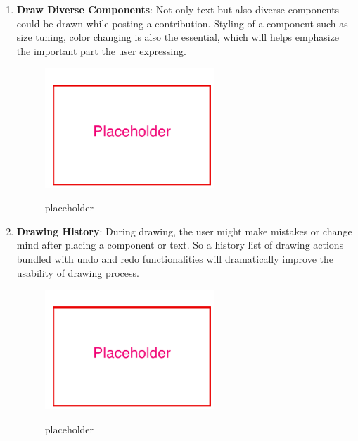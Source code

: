 \begin{enumerate}
\item
\textbf{Draw Diverse Components}: Not only text but also diverse components could be drawn while posting a contribution. Styling of a component such as size tuning, color changing is also the essential, which will helps emphasize the important part the user expressing.

\begin{figure}[!htbp]
  \caption{placeholder}
  \centering
    \includegraphics[width=0.6\textwidth]{Figures/placeholder.png}
  \label{fig:placeholder}
\end{figure}

\item
\textbf{Drawing History}: During drawing, the user might make mistakes or change mind after placing a component or text. So a history list of drawing actions bundled with undo and redo functionalities will dramatically improve the usability of drawing process.

\begin{figure}[!htbp]
  \caption{placeholder}
  \centering
    \includegraphics[width=0.6\textwidth]{Figures/placeholder.png}
  \label{fig:placeholder}
\end{figure}


\end{enumerate}


